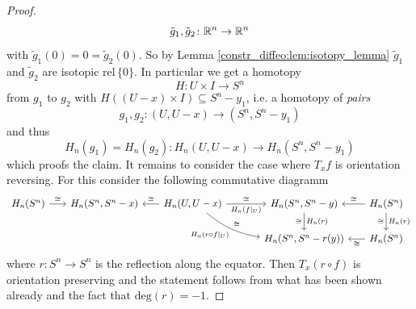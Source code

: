 \begin{proof}
\[
\tilde{g}_1,\tilde{g}_2 \colon \mathbb{R}^n \to \mathbb{R}^n
\]
with $\tilde{g}_1(0) = 0 = \tilde{g}_2(0)$. So by Lemma \ref{constr_diffeo:lem:isotopy_lemma} $\tilde{g}_1$ and $\tilde{g}_2$ are isotopic $\mathrm{rel}\, \{0\}$. In particular we get a homotopy
\[
H \colon U \times I \to S^n
\]
from $g_1$ to $g_2$ with $H((U-x) \times I) \subseteq S^n-y_1$, i.e. a homotopy of \textit{pairs}
\[
g_1,g_2 \colon (U,U-x) \to (S^n,S^n-y_1)
\]
and thus 
\[
H_n(g_1) = H_n(g_2) \colon H_n(U,U-x) \to H_n(S^n,S^n-y_1)
\]
which proofs the claim. It remains to consider the case where $T_xf$ is orientation reversing. For this consider the following commutative diagramm
\[\begin{tikzcd}[column sep = 1.7em]
	{H_n(S^n)} & {H_n(S^n,S^n-x)} & {H_n(U,U-x)} && {H_n(S^n,S^n-y)} & {H_n(S^n)} \\
	&&&& {H_n(S^n,S^n-r(y))} & {H_n(S^n)}
	\arrow["\cong", from=1-1, to=1-2]
	\arrow["\cong"', from=1-3, to=1-2]
	\arrow["{H_n(f|_U)}"', "\cong", from=1-3, to=1-5]
	\arrow["{H_n(r \circ f|_U)}"',"\cong", bend right = 15, from=1-3, to=2-5]
	\arrow["{H_n(r)}","\cong"', from=1-5, to=2-5]
	\arrow["\cong"', from=1-6, to=1-5]
	\arrow["{H_n(r)}","\cong"', from=1-6, to=2-6]
	\arrow["\cong", from=2-6, to=2-5]
\end{tikzcd}\]
where $r \colon S^n \to S^n$ is the reflection along the equator. Then $T_x(r \circ f)$ is orientation preserving and the statement follows from what has been shown already and the fact that $\mathrm{deg}(r) = -1$.
\end{proof}